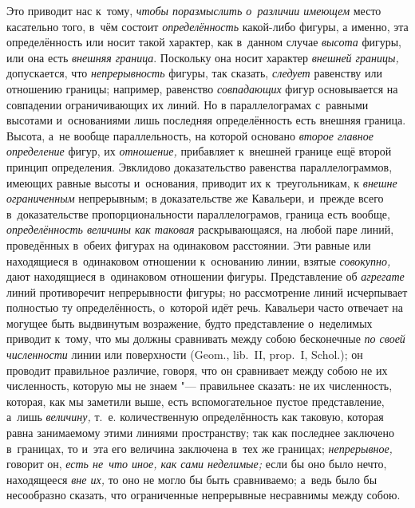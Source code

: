 Это приводит нас к~тому, {\em чтобы поразмыслить о~различии имеющем} место
касательно того, в~чём состоит {\em определённость} какой-либо фигуры, а
именно, эта определённость или носит такой характер, как в~данном случае
{\em высота} фигуры, или она есть {\em внешняя граница}. Поскольку она носит
характер {\em внешней границы,} допускается, что {\em непрерывность} фигуры,
так сказать, {\em следует} равенству или отношению границы; например, равенство
{\em совпадающих} фигур основывается на совпадении ограничивающих их линий. Но
в параллелограмах с~равными высотами и~основаниями лишь последняя
определённость есть внешняя граница. Высота, а~не вообще параллельность, на
которой основано {\em второе главное определение} фигур, их {\em отношение,}
прибавляет к~внешней границе ещё второй принцип определения. Эвклидово
доказательство равенства параллелограммов, имеющих равные высоты и~основания,
приводит их к~треугольникам, к {\em внешне ограниченным} непрерывным; в
доказательстве же Кавальери, и~прежде всего в~доказательстве пропорциональности
параллелограмов, граница есть вообще, {\em определённость величины как таковая}
раскрывающаяся, на любой паре линий, проведённых в~обеих фигурах на одинаковом
расстоянии. Эти равные или находящиеся в~одинаковом отношении к~основанию
линии, взятые {\em совокупно,} дают находящиеся в~одинаковом отношении фигуры.
Представление об {\em агрегате} линий противоречит непрерывности фигуры; но
рассмотрение линий исчерпывает полностью ту определённость, о~которой идёт
речь. Кавальери часто отвечает на могущее быть выдвинутым возражение, будто
представление о~неделимых приводит к~тому, что мы должны сравнивать между собою
бесконечные {\em по своей численности} линии или поверхности (Geom., lib.~II,
prop.~I, Schol.); он проводит правильное различие, говоря, что он сравнивает
между собою не их численность, которую мы не знаем "--- правильнее сказать: не
их численность, которая, как мы заметили выше, есть вспомогательное пустое
представление, а~лишь {\em величину,} т.~е. количественную определённость как
таковую, которая равна занимаемому этими линиями пространству; так как
последнее заключено в~границах, то и~эта его величина заключена в~тех же
границах; {\em непрерывное,} говорит он, {\em есть не~что иное, как сами
неделимые;} если бы оно было нечто, находящееся {\em вне их,} то оно не могло
бы быть сравниваемо; а~ведь было бы несообразно сказать, что ограниченные
непрерывные несравнимы между собою.

